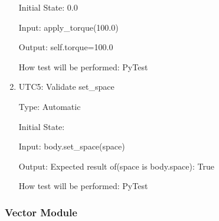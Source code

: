 \documentclass[12pt, titlepage]{article}
\begin{document}
\begin{enumerate}
Initial State: 0.0

Input: apply\_torque(100.0)

Output: self.torque=100.0

How test will be performed: PyTest

\item{UTC5}{: Validate set\_space\\}

Type: Automatic

Initial State: 

Input: body.set\_space(space)

Output: Expected result of(space is body.space): True

How test will be performed: PyTest\\


\end{enumerate}

\subsubsection{Vector Module}
\end{document}
